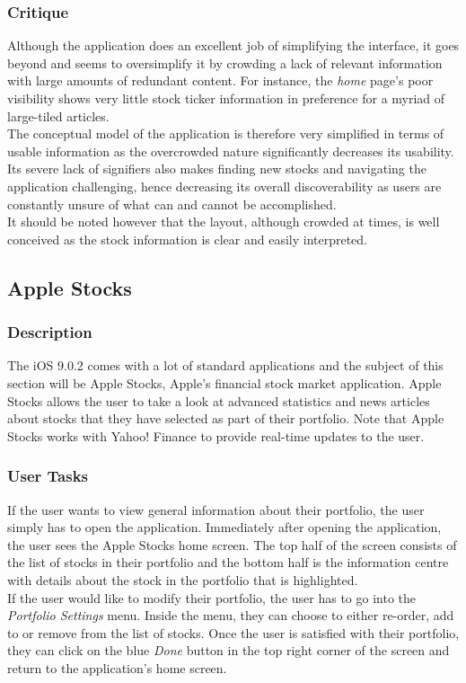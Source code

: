 \documentclass{sigchi}
\begin{document}
\subsubsection{Critique}
Although the application does an excellent job of simplifying the interface, it goes beyond and seems to oversimplify it by crowding a lack of relevant information with large amounts of redundant content. For instance, the \textit{home} page's poor visibility shows very little stock ticker information in preference for a myriad of large-tiled articles. \\
The conceptual model of the application is therefore very simplified in terms of usable information as the overcrowded nature significantly decreases its usability. Its severe lack of signifiers also makes finding new stocks and navigating the application challenging, hence decreasing its overall discoverability as users are constantly unsure of what can and cannot be accomplished. \\
It should be noted however that the layout, although crowded at times, is well conceived as the stock information is clear and easily interpreted.



\subsection{Apple Stocks}
\subsubsection{Description}
The iOS 9.0.2 comes with a lot of standard applications and the subject of this section will be Apple Stocks, Apple's financial stock market application. Apple Stocks allows the user to take a look at advanced statistics and news articles about stocks that they have selected as part of their portfolio. Note that Apple Stocks works with Yahoo! Finance to provide real-time updates to the user.

\subsubsection{User Tasks}
If the user wants to view general information about their portfolio, the user simply has to open the application. Immediately after opening the application, the user sees the Apple Stocks home screen. The top half of the screen consists of the list of stocks in their portfolio and the bottom half is the information centre with details about the stock in the portfolio that is highlighted. \\
If the user would like to modify their portfolio, the user has to go into the \textit{Portfolio Settings} menu. Inside the menu, they can choose to either re-order, add to or remove from the list of stocks. Once the user is satisfied with their portfolio, they can click on the blue \textit{Done} button in the top right corner of the screen and return to the application's home screen.
\end{document}
